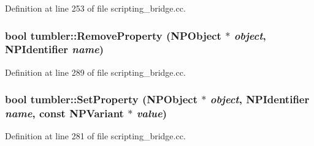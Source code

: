Definition at line 253 of file scripting\_\-bridge.cc.

\hypertarget{namespacetumbler_a4b3edf30d857d6821ff31c7676cae983}{
\subsubsection[{RemoveProperty}]{\setlength{\rightskip}{0pt plus 5cm}bool tumbler::RemoveProperty (NPObject $\ast$ {\em object}, \/  NPIdentifier {\em name})}}
\label{namespacetumbler_a4b3edf30d857d6821ff31c7676cae983}


Definition at line 289 of file scripting\_\-bridge.cc.

\hypertarget{namespacetumbler_a036219547d706a1d483feb048bcacc00}{
\subsubsection[{SetProperty}]{\setlength{\rightskip}{0pt plus 5cm}bool tumbler::SetProperty (NPObject $\ast$ {\em object}, \/  NPIdentifier {\em name}, \/  const NPVariant $\ast$ {\em value})}}
\label{namespacetumbler_a036219547d706a1d483feb048bcacc00}


Definition at line 281 of file scripting\_\-bridge.cc.

